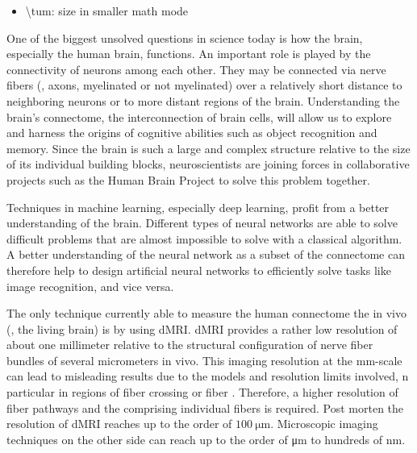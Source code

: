 \label{sec:abstract}
%
\begin{itemize}
   \item \textbackslash tum{}: size in smaller math mode %
\end{itemize}
%
% 
% 
One of the biggest unsolved questions in science today is how the brain, especially the human brain, functions.
An important role is played by the connectivity of neurons among each other.
They may be connected via nerve fibers (\ie{}, axons, myelinated or not myelinated) over a relatively short distance to neighboring neurons or to more distant regions of the brain.
Understanding the brain's connectome, the interconnection of brain cells, will allow us to explore and harness the origins of cognitive abilities such as object recognition and memory.
Since the brain is such a large and complex structure relative to the size of its individual building blocks, neuroscientists are joining forces in collaborative projects such as the Human Brain Project to solve this problem together.\\
\cite{Markram2006, Shen2012, Amunts2013, Amunts2016}
\par
% 
Techniques in machine learning, especially deep learning, profit from a better understanding of the brain.
Different types of neural networks are able to solve difficult problems that are almost impossible to solve with a classical algorithm.
A better understanding of the neural network as a subset of the connectome can therefore help to design artificial neural networks to efficiently solve tasks like image recognition, and vice versa. \\
\cite{murphy2013machine, Goodfellow-et-al-2016}
\par
% 
The only technique currently able to measure the human connectome the in vivo (\ie{}, the living brain) is by using \ac{dMRI}.
\ac{dMRI} provides a rather low resolution of about one millimeter relative to the structural configuration of nerve fiber bundles of several micrometers in vivo.
This imaging resolution at the \si{\milli\meter}-scale can lead to misleading results due to the models and resolution limits involved, n particular in regions of fiber crossing or fiber  \cite{MaierHein2017}. 
Therefore, a higher resolution of fiber pathways and the comprising individual fibers is required.
Post morten the resolution of \ac{dMRI} reaches up to the order of $\SI{100}{\micro\meter}$.
Microscopic imaging techniques on the other side can reach up to the order of \si{\micro\meter} to hundreds of \si{\nano\meter}.
